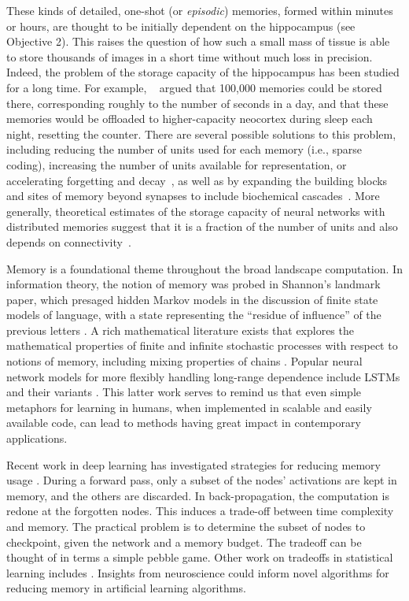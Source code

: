 These kinds of detailed, one-shot (or \textit{episodic}) memories,
formed within minutes or hours, are thought to be initially dependent
on the hippocampus (see Objective 2). This raises the question of how
such a small mass of tissue is able to store thousands of images in a
short time without much loss in precision. Indeed, the problem of the
storage capacity of the hippocampus has been studied for a long time.
For example, ~\citet{Marr:1971} argued that 100,000 memories could be
stored there, corresponding roughly to the number of seconds in a day,
and that these memories would be offloaded to higher-capacity
neocortex during sleep each night, resetting the counter. There are
several possible solutions to this problem, including reducing the
number of units used for each memory (i.e., sparse coding), increasing
the number of units available for representation, or accelerating
forgetting and decay~\citep{McNaughton:1987}, as well as by expanding
the building blocks and sites of memory beyond synapses to include
biochemical cascades~\citep{Fusi:2005}. More generally, theoretical
estimates of the storage capacity of neural networks with distributed
memories suggest that it is a fraction of the number of units
and also depends on connectivity~\citep{Hopfield:1982,Brunel:2016}.

\statbackground{} Memory is a foundational theme throughout the broad
landscape computation. In information theory, the notion of memory was
probed in Shannon's landmark paper, which presaged hidden Markov
models in the discussion of finite state models of language, with a
state representing the ``residue of influence'' of the previous
letters \citep{Shannon:48}. A rich mathematical literature exists that
explores the mathematical properties of finite and infinite stochastic
processes with respect to notions of memory, including mixing
properties of chains \citep{pollard84}. Popular neural network models
for more flexibly handling long-range dependence include LSTMs and
their variants \citep{sepp97,gers00}. This latter work serves to
remind us that even simple metaphors for learning in humans, when
implemented in scalable and easily available code, can lead to methods
having great impact in contemporary applications.

Recent work in deep learning has investigated
strategies for reducing memory usage \citep{ChenXZG16}. During a
forward pass, only a subset of the nodes' activations are kept in
memory, and the others are discarded. In back-propagation, the
computation is redone at the forgotten nodes. This induces a trade-off
between time complexity and memory. The practical problem is to
determine the subset of nodes to checkpoint, given the network and a
memory budget. The tradeoff can be thought of in terms a simple pebble
game.  Other work on tradeoffs in statistical learning includes
\citep{lucic15tradeoffs}. Insights from neuroscience could inform novel algorithms for reducing
memory in artificial learning algorithms.

